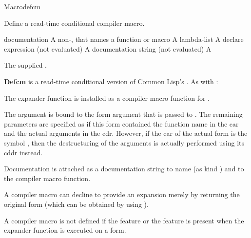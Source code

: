 \documentclass[10pt,twoside,english,pdftex]{article}
\begin{document}
\begin{functiondoc}{Macro}{defcm}{ 
    \superstar
    \returns{} }
%
%

\fnsyntax

\fnpurpose Define a read-time conditional compiler macro.

\fnpackage {}

\fnmodule {}

\fnargs
\begin{args}{documentation}
\arg[name] A non-\nil,  that names a function or macro
 A lambda-list
\arg[declaration] A declare expression (not evaluated)
\arg[documentation] A documentation string (not evaluated)
\arg[form] A 
\end{args}

\fnreturns The supplied .

\fndescription 
%
\textbf{Defcm} is a read-time conditional version of Common Lisp's
.  As with
:
%
\begin{tightitemize}
\item The expander function is installed as a compiler macro function for
  .
\item The  argument is bound to the form argument that is passed
  to . The remaining 
  parameters are specified as if this form contained the function name in the
  car and the actual arguments in the cdr.  However, if the car of the actual
  form is the symbol , then the destructuring of the
  arguments is actually performed using its cddr instead.
\item Documentation is attached as a documentation string to name (as kind
  ) and to the compiler macro function.
\item A compiler macro can decline to provide an expansion merely by returning
  the original form (which can be obtained by using ).
\end{tightitemize}
%
A compiler macro is not defined if the feature
 or the feature
 is present when the expander
function is executed on a form.


\end{functiondoc}
\end{document}

